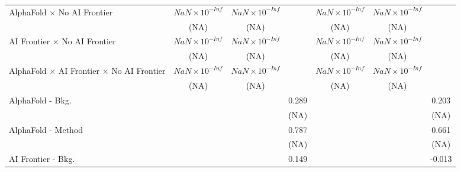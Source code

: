 \begin{tabular}{lcccccc}
   AlphaFold $\times$ No AI Frontier                                          & $NaN\times 10^{-Inf}$  & $NaN\times 10^{-Inf}$  &                        & $NaN\times 10^{-Inf}$  & $NaN\times 10^{-Inf}$  &   \\   
                                                                              & (NA)                   & (NA)                   &                        & (NA)                   & (NA)                   &   \\   
   AI Frontier $\times$ No AI Frontier                                        & $NaN\times 10^{-Inf}$  & $NaN\times 10^{-Inf}$  &                        & $NaN\times 10^{-Inf}$  & $NaN\times 10^{-Inf}$  &   \\   
                                                                              & (NA)                   & (NA)                   &                        & (NA)                   & (NA)                   &   \\   
   AlphaFold $\times$ AI Frontier $\times$ No AI Frontier                     & $NaN\times 10^{-Inf}$  & $NaN\times 10^{-Inf}$  &                        & $NaN\times 10^{-Inf}$  & $NaN\times 10^{-Inf}$  &   \\   
                                                                              & (NA)                   & (NA)                   &                        & (NA)                   & (NA)                   &   \\   
   AlphaFold - Bkg.                                                           &                        &                        & 0.289                  &                        &                        & 0.203\\   
                                                                              &                        &                        & (NA)                   &                        &                        & (NA)\\   
   AlphaFold - Method                                                         &                        &                        & 0.787                  &                        &                        & 0.661\\   
                                                                              &                        &                        & (NA)                   &                        &                        & (NA)\\   
   AI Frontier - Bkg.                                                         &                        &                        & 0.149                  &                        &                        & -0.013\\   

\end{tabular}
